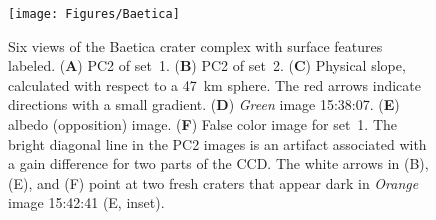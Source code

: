 \documentclass[3p,authoryear]{elsarticle}
\begin{document}
\newpage
\clearpage

\begin{figure}
\centering
\texttt{[image: Figures/Baetica]}
\caption{Six views of the Baetica crater complex with surface features labeled. ({\bf A}) PC2 of set~1. ({\bf B}) PC2 of set~2. ({\bf C}) Physical slope, calculated with respect to a 47~km sphere. The red arrows indicate directions with a small gradient. ({\bf D}) {\it Green} image 15:38:07. ({\bf E}) albedo (opposition) image. ({\bf F}) False color image for set~1. The bright diagonal line in the PC2 images is an artifact associated with a gain difference for two parts of the CCD. The white arrows in (B), (E), and (F) point at two fresh craters that appear dark in {\it Orange} image 15:42:41 (E, inset).}
\label{fig:Baetica}
\end{figure}
\end{document}
